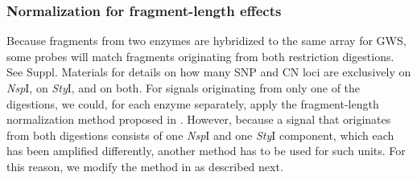 \documentclass{bioinfo}
\newcommand{\GWS}{GWS\xspace}
\newcommand{\GWSSix}{GWS6\xspace}
\newcommand{\NspI}{\emph{Nsp}I\xspace}
\newcommand{\StyI}{\emph{Sty}I\xspace}
\begin{document}
\subsubsection{Normalization for fragment-length effects}
\label{secFLnorm}
Because fragments from two enzymes are hybridized to the same array for \GWS, some probes will match fragments originating from both restriction digestions.  See Suppl. Materials for details on how many SNP and CN loci are exclusively on \NspI, on \StyI, and on both.
For signals originating from only one of the digestions, we could, for each enzyme separately, apply the fragment-length normalization method proposed in \citet{BengtssonH_etal_2008}.  However, because a signal that originates from both digestions consists of one \NspI and one \StyI component, which each has been amplified differently, another method has to be used for such units.  For this reason, we modify the method in \citet{BengtssonH_etal_2008} as described next. 
\end{document}
